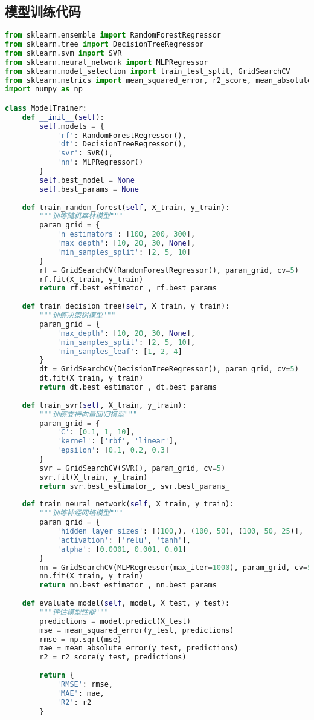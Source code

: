 \subsection{模型训练代码}
\begin{lstlisting}[language=Python, caption=模型训练实现, label=lst:model_training]
from sklearn.ensemble import RandomForestRegressor
from sklearn.tree import DecisionTreeRegressor
from sklearn.svm import SVR
from sklearn.neural_network import MLPRegressor
from sklearn.model_selection import train_test_split, GridSearchCV
from sklearn.metrics import mean_squared_error, r2_score, mean_absolute_error
import numpy as np

class ModelTrainer:
    def __init__(self):
        self.models = {
            'rf': RandomForestRegressor(),
            'dt': DecisionTreeRegressor(),
            'svr': SVR(),
            'nn': MLPRegressor()
        }
        self.best_model = None
        self.best_params = None
        
    def train_random_forest(self, X_train, y_train):
        """训练随机森林模型"""
        param_grid = {
            'n_estimators': [100, 200, 300],
            'max_depth': [10, 20, 30, None],
            'min_samples_split': [2, 5, 10]
        }
        rf = GridSearchCV(RandomForestRegressor(), param_grid, cv=5)
        rf.fit(X_train, y_train)
        return rf.best_estimator_, rf.best_params_
    
    def train_decision_tree(self, X_train, y_train):
        """训练决策树模型"""
        param_grid = {
            'max_depth': [10, 20, 30, None],
            'min_samples_split': [2, 5, 10],
            'min_samples_leaf': [1, 2, 4]
        }
        dt = GridSearchCV(DecisionTreeRegressor(), param_grid, cv=5)
        dt.fit(X_train, y_train)
        return dt.best_estimator_, dt.best_params_
    
    def train_svr(self, X_train, y_train):
        """训练支持向量回归模型"""
        param_grid = {
            'C': [0.1, 1, 10],
            'kernel': ['rbf', 'linear'],
            'epsilon': [0.1, 0.2, 0.3]
        }
        svr = GridSearchCV(SVR(), param_grid, cv=5)
        svr.fit(X_train, y_train)
        return svr.best_estimator_, svr.best_params_
    
    def train_neural_network(self, X_train, y_train):
        """训练神经网络模型"""
        param_grid = {
            'hidden_layer_sizes': [(100,), (100, 50), (100, 50, 25)],
            'activation': ['relu', 'tanh'],
            'alpha': [0.0001, 0.001, 0.01]
        }
        nn = GridSearchCV(MLPRegressor(max_iter=1000), param_grid, cv=5)
        nn.fit(X_train, y_train)
        return nn.best_estimator_, nn.best_params_
    
    def evaluate_model(self, model, X_test, y_test):
        """评估模型性能"""
        predictions = model.predict(X_test)
        mse = mean_squared_error(y_test, predictions)
        rmse = np.sqrt(mse)
        mae = mean_absolute_error(y_test, predictions)
        r2 = r2_score(y_test, predictions)
        
        return {
            'RMSE': rmse,
            'MAE': mae,
            'R2': r2
        }
\end{lstlisting}

